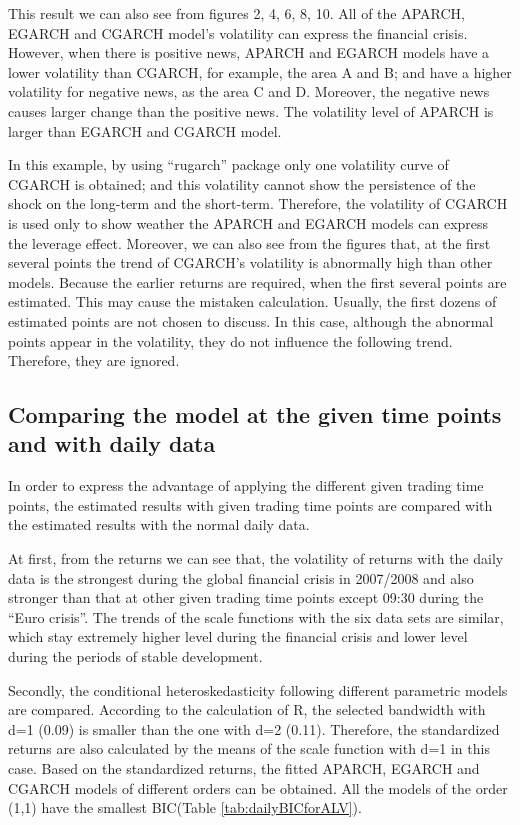 This result we can also see from figures 2, 4, 6, 8, 10. All of the APARCH, EGARCH and CGARCH model’s volatility can express the financial crisis. However, when there is positive news, APARCH and EGARCH models have a lower volatility than CGARCH, for example, the area A and B; and have a higher volatility for negative news, as the area C and D. Moreover, the negative news causes larger change than the positive news. The volatility level of APARCH is larger than EGARCH and CGARCH model.

In this example, by using ``rugarch'' package only one volatility curve of CGARCH is obtained; and this volatility cannot show the persistence of the shock on the long-term and the short-term. Therefore, the volatility of CGARCH is used only to show weather the APARCH and EGARCH models can express the leverage effect. Moreover, we can also see from the figures that, at the first several points the trend of CGARCH’s volatility is abnormally high than other models. Because the earlier returns are required, when the first several points are estimated. This may cause the mistaken calculation. Usually, the first dozens of estimated points are not chosen to discuss. In this case, although the abnormal points appear in the volatility, they do not influence the following trend. Therefore, they are ignored.

\subsection{Comparing the model at the given time points and with daily data}

In order to express the advantage of applying the different given trading time points, the estimated results with given trading time points are compared with the estimated results with the normal daily data.

At first, from the returns we can see that, the volatility of returns with the daily data is the strongest during the global financial crisis in 2007/2008 and also stronger than that at other given trading time points except 09:30 during the ``Euro crisis''. The trends of the scale functions with the six data sets are similar, which stay extremely higher level during the financial crisis and lower level during the periods of stable development.


Secondly, the conditional heteroskedasticity following different parametric models are compared. According to the calculation of R, the selected bandwidth with d=1 (0.09) is smaller than the one with d=2 (0.11). Therefore, the standardized returns are also calculated by the means of the scale function with d=1 in this case. Based on the standardized returns, the fitted APARCH, EGARCH and CGARCH models of different orders can be obtained. All the models of the order (1,1) have the smallest BIC(Table \ref{tab:dailyBICforALV}).



